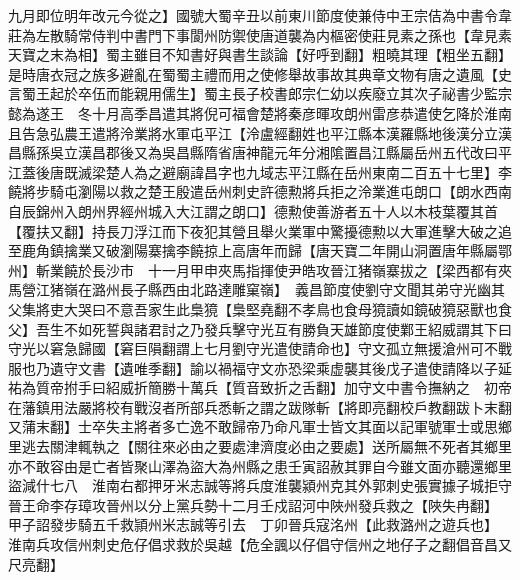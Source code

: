 九月即位明年改元今從之】國號大蜀辛丑以前東川節度使兼侍中王宗佶為中書令韋莊為左散騎常侍判中書門下事閬州防禦使唐道襲為内樞密使莊見素之孫也【韋見素天寶之末為相】蜀主雖目不知書好與書生談論【好呼到翻】粗曉其理【粗坐五翻】是時唐衣冠之族多避亂在蜀蜀主禮而用之使修舉故事故其典章文物有唐之遺風【史言蜀王起於卒伍而能親用儒生】蜀主長子校書郎宗仁幼以疾廢立其次子祕書少監宗懿為遂王　冬十月高季昌遣其將倪可福會楚將秦彦暉攻朗州雷彦恭遣使乞降於淮南且告急弘農王遣將泠業將水軍屯平江【泠盧經翻姓也平江縣本漢羅縣地後漢分立漢昌縣孫吳立漢昌郡後又為吳昌縣隋省唐神龍元年分湘隂置昌江縣屬岳州五代改曰平江蓋後唐既滅梁楚人為之避廟諱昌字也九域志平江縣在岳州東南二百五十七里】李饒將步騎屯瀏陽以救之楚王殷遣岳州刺史許德勲將兵拒之泠業進屯朗口【朗水西南自辰錦州入朗州界經州城入大江謂之朗口】德勲使善游者五十人以木枝葉覆其首【覆扶又翻】持長刀浮江而下夜犯其營且舉火業軍中驚擾德勲以大軍進擊大破之追至鹿角鎮擒業又破瀏陽寨擒李饒掠上高唐年而歸【唐天寶二年開山洞置唐年縣屬鄂州】斬業饒於長沙市　十一月甲申夾馬指揮使尹皓攻晉江猪嶺寨拔之【梁西都有夾馬營江猪嶺在潞州長子縣西由北路達雕窠嶺】　義昌節度使劉守文聞其弟守光幽其父集將吏大哭曰不意吾家生此梟獍【梟堅堯翻不孝鳥也食母獍讀如鏡破獍惡獸也食父】吾生不如死誓與諸君討之乃發兵擊守光互有勝負天雄節度使鄴王紹威謂其下曰守光以窘急歸國【窘巨隕翻謂上七月劉守光遣使請命也】守文孤立無援滄州可不戰服也乃遺守文書【遺唯季翻】諭以禍福守文亦恐梁乘虚襲其後戊子遣使請降以子延祐為質帝拊手曰紹威折簡勝十萬兵【質音致折之舌翻】加守文中書令撫納之　初帝在藩鎮用法嚴將校有戰沒者所部兵悉斬之謂之跋隊斬【將即亮翻校戶教翻跋卜末翻又蒲末翻】士卒失主將者多亡逸不敢歸帝乃命凡軍士皆文其面以記軍號軍士或思鄉里逃去關津輒執之【關往來必由之要處津濟度必由之要處】送所屬無不死者其鄉里亦不敢容由是亡者皆聚山澤為盜大為州縣之患壬寅詔赦其罪自今雖文面亦聽還鄉里盜減什七八　淮南右都押牙米志誠等將兵度淮襲潁州克其外郭刺史張實據子城拒守　晉王命李存璋攻晉州以分上黨兵勢十二月壬戍詔河中陜州發兵救之【陜失冉翻】　甲子詔發步騎五千救頴州米志誠等引去　丁卯晉兵寇洺州【此救潞州之遊兵也】　淮南兵攻信州刺史危仔倡求救於吳越【危全諷以仔倡守信州之地仔子之翻倡音昌又尺亮翻】

